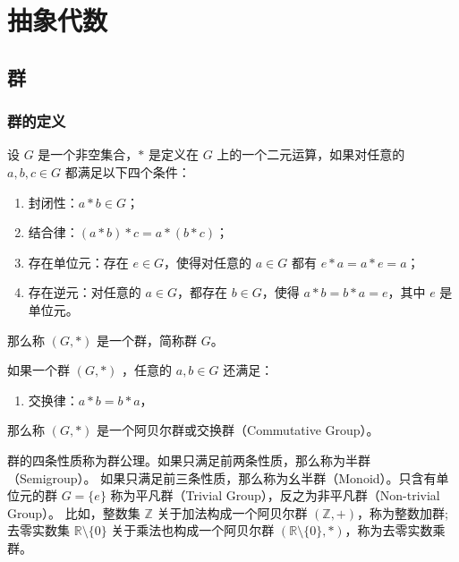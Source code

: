 \chapter{抽象代数}
\section{群}


\subsection{群的定义}

\begin{definition}[群 Group]
    设 $G$ 是一个非空集合，$*$ 是定义在 $G$ 上的一个二元运算，如果对任意的 $a, b, c\in G$ 都满足以下四个条件：
    \begin{enumerate}
        \item 封闭性：$a * b\in G$；
        \item 结合律：$(a * b) * c = a * (b * c)$；
        \item 存在单位元：存在 $e\in G$，使得对任意的 $a\in G$ 都有 $e * a = a * e = a$；
        \item 存在逆元：对任意的 $a\in G$，都存在 $b\in G$，使得 $a * b = b * a = e$，其中 $e$ 是单位元。
    \end{enumerate}
    那么称 $(G, *)$ 是一个群，简称群 $G$。
    \label{def:group}
\end{definition}
\vspace{1em}

\begin{definition}
    如果一个群 $(G, *)$ ，任意的 $a, b\in G$ 还满足：
    \begin{enumerate}
        \item 交换律：$a * b = b * a$，
    \end{enumerate}
    那么称 $(G, *)$ 是一个阿贝尔群或交换群（Commutative Group）。
    \label{def:abelian_group}
\end{definition}

\begin{note}
    群的四条性质称为群公理。如果只满足前两条性质，那么称为半群（Semigroup）。
    如果只满足前三条性质，那么称为幺半群（Monoid）。只含有单位元的群 $G=\{e\}$ 称为平凡群（Trivial Group），反之为非平凡群（Non-trivial Group）。
    比如，整数集 $\mathbb{Z}$ 关于加法构成一个阿贝尔群 $(\mathbb{Z}, +)$，称为整数加群;
    去零实数集 $\mathbb{R}\setminus\{0\}$ 关于乘法也构成一个阿贝尔群 $(\mathbb{R}\setminus\{0\}, *)$，称为去零实数乘群。
\end{note}
\vspace{1em}

